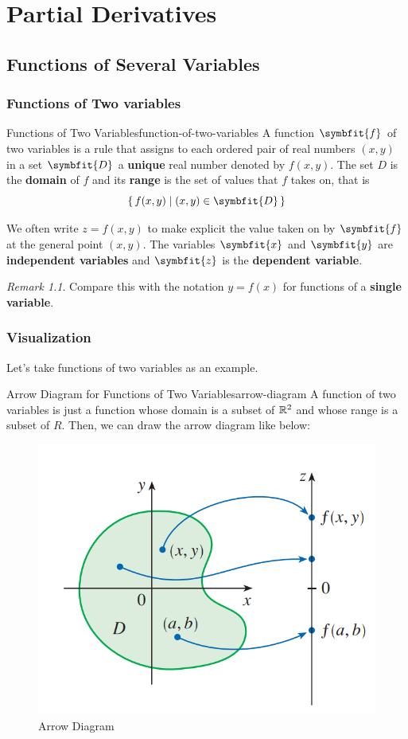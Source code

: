 \documentclass[math,code]{amznotes}
\theoremstyle{remark}
\newtheorem*{remark}{Remark}
\begin{document}
\tableofcontents

\chapter{Partial Derivatives}
\section{Functions of Several Variables}
\subsection{Functions of Two variables}
\begin{dfnbox}{Functions of Two Variables}{function-of-two-variables}
    A function $\symbfit{f}$ of two variables is a rule that assigns to each ordered pair of real numbers $(x,y)$ in a set $\symbfit{D}$ a {\color{red} \textbf{unique}} real number denoted by $f(x,y)$. The set $D$ is the {\color{red} \textbf{domain}} of $f$ and its {\color{red} \textbf{range}} is the set of values that $f$ takes on, that is
    \begin{displaymath}
        \left\{ \, f(x,y) \mid (x,y) \in \symbfit{D} \, \right\}
    \end{displaymath}
\end{dfnbox}
We often write $z=f(x,y)$ to make explicit the value taken on by $\symbfit{f}$ at the general point $(x,y)$. The variables $\symbfit{x}$ and $\symbfit{y}$ are {\color{red} \textbf{independent variables}} and $\symbfit{z}$ is the {\color{red} \textbf{dependent variable}}.
\begin{notebox}
    \begin{remark}
        Compare this with the notation $y=f(x)$ for functions of a {\color{red} \textbf{single variable}}.
    \end{remark}
\end{notebox}
\subsection{Visualization}
Let's take functions of two variables as an example.
\begin{exbox}{Arrow Diagram for Functions of Two Variables}{arrow-diagram}
    A function of two variables is just a function whose domain is a subset of $\mathbb{R}^2$ and whose range is a subset of $R$. Then, we can draw the arrow diagram like below:
    \begin{figure}[H]
    \centering
    \includegraphics[width=0.35\linewidth]{images/arrow-diagram.png}
    \caption{Arrow Diagram}
    \label{fig:arrow-diagram}
    \end{figure}
\end{exbox}
\end{document}
